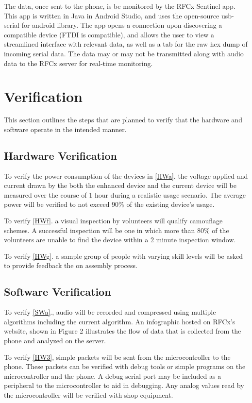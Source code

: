 \documentclass{article}
\numberwithin{figure}{section}
\numberwithin{equation}{section}
\begin{document}
{The data, once sent to the phone, is be monitored by the RFCx Sentinel app. This app is written in Java in Android Studio, and uses the open-source usb-serial-for-android library. The app opens a connection upon discovering a compatible device (FTDI is compatible), and allows the user to view a streamlined interface with relevant data, as well as a tab for the raw hex dump of incoming serial data. The data may or may not be transmitted along with audio data to the RFCx server for real-time monitoring.

\section{Verification} \label{sect:verification}
This section outlines the steps that are planned to verify that the hardware and software operate in the intended manner.
\subsection{Hardware Verification} \label{sect:hardwareverification}
To verify the power consumption of the devices in \ref{HWa}. the voltage applied and current drawn by the both the enhanced device and the current device will be measured over the course of 1 hour during a realistic usage scenario. The average power will be verified to not exceed 90\% of the existing device’s usage.

To verify \ref{HWf}. a visual inspection by volunteers will qualify camouflage schemes. A successful inspection will be one in which more than 80\% of the volunteers are unable to find the device within a 2 minute inspection window.

To verify \ref{HWg}. a sample group of people with varying skill levels will be asked to provide feedback the on assembly process.

\subsection{Software Verification} \label{sect:softwareverification}
To verify \ref{SWa}., audio will be recorded and compressed using multiple algorithms including the current algorithm. An infographic hosted on RFCx’s website, shown in Figure 2 illustrates the flow of data that is collected from the phone and analyzed on the server.

To verify \ref{HW3}, simple packets will be sent from the microcontroller to the phone. These packets can be verified with debug tools or simple programs on the microcontroller and the phone. A debug serial port may be included as a peripheral to the microcontroller to aid in debugging. Any analog values read by the microcontroller will be verified with shop equipment.

}
\end{document}
